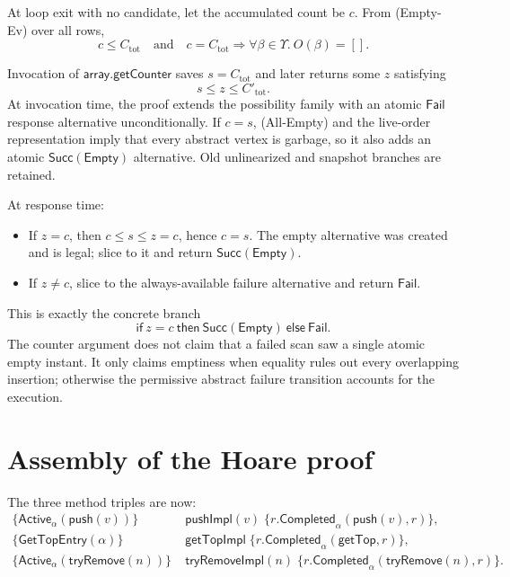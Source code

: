 \documentclass[11pt]{article}
\theoremstyle{definition}
\theoremstyle{remark}
\newcommand{\GetTop}{\mathsf{getTop}}
\newcommand{\Push}{\mathsf{push}}
\newcommand{\TryRemove}{\mathsf{tryRemove}}
\newcommand{\Succ}{\mathsf{Succ}}
\newcommand{\Fail}{\mathsf{Fail}}
\newcommand{\Empty}{\mathsf{Empty}}
\begin{document}
At loop exit with no candidate, let the accumulated count be \(c\).  From
\textup{(Empty-Ev)} over all rows,
\[
  c\le C_{\mathrm{tot}}
  \quad\text{and}\quad
  c=C_{\mathrm{tot}}\Rightarrow
  \forall\beta\in\Upsilon.\ O(\beta)=[].
\tag{All-Empty}
\]

Invocation of \(\mathsf{array.getCounter}\) saves
\(s=C_{\mathrm{tot}}\) and later returns some \(z\) satisfying
\[
  s\le z\le C'_{\mathrm{tot}}.
\tag{Counter-Bounds}
\]
At invocation time, the proof extends the possibility family with an atomic
\(\Fail\) response alternative unconditionally.  If \(c=s\),
\textup{(All-Empty)} and the live-order representation imply that every
abstract vertex is garbage, so it also adds an atomic
\(\Succ(\Empty)\) alternative.  Old unlinearized and snapshot branches are
retained.

At response time:
\begin{itemize}
\item If \(z=c\), then \(c\le s\le z=c\), hence \(c=s\).  The empty
alternative was created and is legal; slice to it and return
\(\Succ(\Empty)\).
\item If \(z\ne c\), slice to the always-available failure alternative and
return \(\Fail\).
\end{itemize}
This is exactly the concrete branch
\[
  \mathsf{if}\ z=c\ \mathsf{then}\ \Succ(\Empty)\ \mathsf{else}\ \Fail.
\]
The counter argument does not claim that a failed scan saw a single atomic
empty instant.  It only claims emptiness when equality rules out every
overlapping insertion; otherwise the permissive abstract failure transition
accounts for the execution.

\section{Assembly of the Hoare proof}

The three method triples are now:
\begin{align*}
\{\mathsf{Active}_\alpha(\Push(v))\}\;&\mathsf{pushImpl}(v)\;
 \{r.\mathsf{Completed}_\alpha(\Push(v),r)\},\\
\{\mathsf{GetTopEntry}(\alpha)\}\;&\mathsf{getTopImpl}\;
 \{r.\mathsf{Completed}_\alpha(\GetTop,r)\},\\
\{\mathsf{Active}_\alpha(\TryRemove(n))\}\;&\mathsf{tryRemoveImpl}(n)\;
 \{r.\mathsf{Completed}_\alpha(\TryRemove(n),r)\}.
\end{align*}
\end{document}
